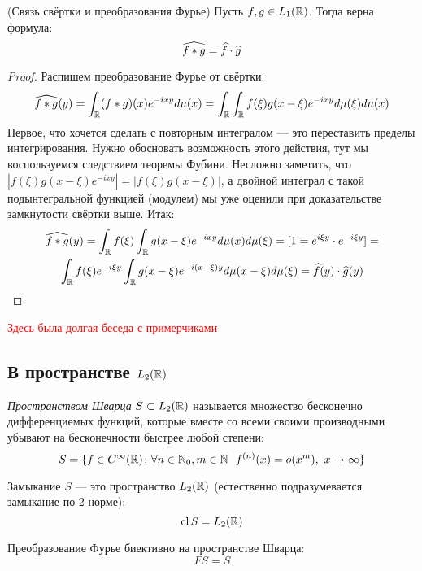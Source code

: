 \begin{proposition} (Связь свёртки и преобразования Фурье)
	Пусть $f, g \in L_1(\mathbb{R})$. Тогда верна формула:
	\[
		\widehat{f * g} = \widehat{f} \cdot \widehat{g} 
	\]
\end{proposition}

\begin{proof}
	Распишем преобразование Фурье от свёртки:
	\[
		\widehat{f * g}(y) = \int_{\mathbb{R}} (f * g)(x)e^{-ixy}d\mu(x) = \int_{\mathbb{R}} \int_{\mathbb{R}} f(\xi)g(x - \xi)e^{-ixy}d\mu(\xi)d\mu(x)
	\]
	Первое, что хочется сделать с повторным интегралом --- это переставить пределы интегрирования. Нужно обосновать возможность этого действия, тут мы воспользуемся следствием теоремы Фубини. Несложно заметить, что $|f(\xi)g(x - \xi)e^{-ixy}| = |f(\xi)g(x - \xi)|$, а двойной интеграл с такой подынтегральной функцией (модулем) мы уже оценили при доказательстве замкнутости свёртки выше. Итак:
	\begin{multline*}
		\widehat{f * g}(y) = \int_{\mathbb{R}} f(\xi) \int_{\mathbb{R}} g(x - \xi)e^{-ixy}d\mu(x)d\mu(\xi) = [1 = e^{i\xi y} \cdot e^{-i\xi y}] =
		\\
		\int_{\mathbb{R}} f(\xi)e^{-i\xi y} \int_{\mathbb{R}} g(x - \xi)e^{-i(x - \xi)y}d\mu(x - \xi)d\mu(\xi) = \widehat{f}(y) \cdot \widehat{g}(y)
	\end{multline*}
	 
\end{proof}

\textcolor{red}{Здесь была долгая беседа с примерчиками}

\subsection{В пространстве $L_2(\mathbb{R})$}

\begin{reminder}
	\textit{Пространством Шварца} $S \subset L_2(\mathbb{R})$ называется множество бесконечно дифференциемых функций, которые вместе со всеми своими производными убывают на бесконечности быстрее любой степени:
	\[
		S = \{f \in C^\infty(\mathbb{R}) \colon \forall n \in \mathbb{N}_0, m \in \mathbb{N}\ \ f^{(n)}(x) = o(x^m),\ x \to \infty\}
	\]
\end{reminder}

\begin{reminder}
	Замыкание $S$ --- это пространство $L_2(\mathbb{R})$ (естественно подразумевается замыкание по 2-норме):
	\[
		\operatorname{cl} S = L_2(\mathbb{R})
	\]
\end{reminder}

\begin{reminder}
	Преобразование Фурье биективно на пространстве Шварца:
	\[
		FS = S 
	\]
\end{reminder}

